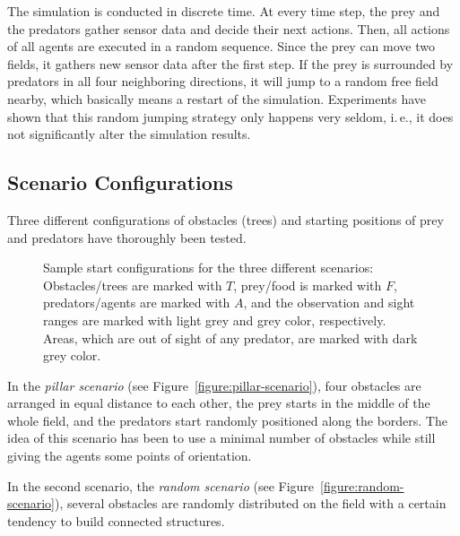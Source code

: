 The simulation is conducted in discrete time. At every time step, the prey and the predators gather sensor data and decide their next actions. Then, all actions of all agents are executed in a random sequence. Since the prey can move two fields, it gathers new sensor data after the first step. If the prey is surrounded by predators in all four neighboring directions, it will jump to a random free field nearby, which basically means a restart of the simulation. Experiments have shown that this random jumping strategy only happens very seldom, i.\,e., it does not significantly alter the simulation results.

\subsection{Scenario Configurations}
\label{subsection:scenario-obstacle}

Three different configurations of obstacles (trees) and star\-ting positions of prey and predators have thoroughly been tested. 

\begin{figure}[ht]
	\hfill
  \hfill
  \caption{Sample start configurations for the three different scenarios: Obstacles/trees are marked with $T$, prey/food is marked with $F$, predators/agents are marked with $A$, and the observation and sight ranges are marked with light grey and grey color, respectively. Areas, which are out of sight of any predator, are marked with dark grey color.}
  \label{figure:scenarios}
\end{figure}

In the \emph{pillar scenario} (see Figure~\ref{figure:pillar-scenario}), four obstacles are arranged in equal distance to each other, the prey starts in the middle of the whole field, and the predators start randomly positioned along the borders. The idea of this scenario has been to use a minimal number of obstacles while still giving the agents some points of orientation.

In the second scenario, the \emph{random scenario} (see Figure~\ref{figure:random-scenario}), several obstacles are randomly distributed on the field with a certain tendency to build connected structures. 

